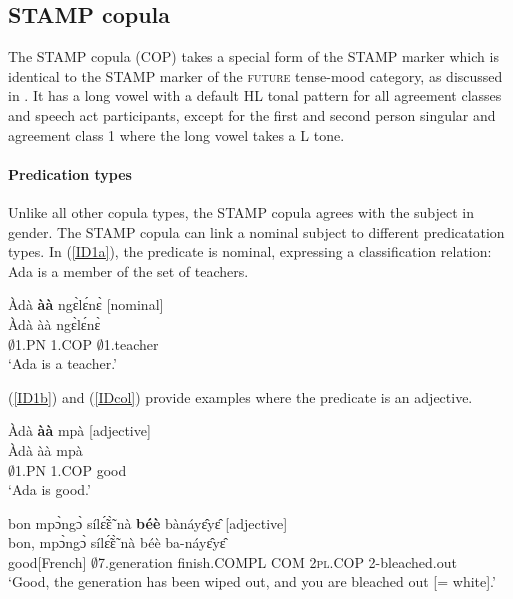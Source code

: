 \subsection{STAMP copula}
\label{sec:COP}

The STAMP copula (COP) takes a  special form of the STAMP marker which is identical to the STAMP marker of the \textsc{future} tense-mood category, as discussed in . It has a long vowel with a default HL tonal pattern for all agreement classes and speech act participants, except for the first and second person singular and agreement class 1 where the long vowel takes a L tone. 

\paragraph{Predication types} Unlike all other copula types, the STAMP copula agrees with the subject in gender. The STAMP copula can link a nominal subject to different predicatation types. In (\ref{ID1a}), the predicate is nominal, expressing a classification relation: Ada is a member of the set of teachers.  


\begin{exe}
\ex\label{ID1a}
  \glll Àdà {\bfseries àà} ngɛ̀lɛ́nɛ̀ \hfill [nominal] \\
        Àdà àà ngɛ̀lɛ́nɛ̀   \\
          $\emptyset$1.PN 1.COP $\emptyset$1.teacher  \\
    \trans `Ada is a teacher.'
\end{exe}

\noindent (\ref{ID1b}) and (\ref{IDcol}) provide examples where the predicate is an adjective.

\begin{exe}
\ex\label{ID1b}
  \glll Àdà {\bfseries àà} mpà \hfill [adjective] \\
        Àdà àà mpà  \\
          $\emptyset$1.PN 1.COP good  \\
    \trans `Ada is good.'
\end{exe}

\begin{exe} 
\ex\label{IDcol}
  \glll bon mpɔ̀ngɔ̀ sílɛ̃́ɛ̃̀ nà {\bfseries béè} bànáyɛ̂yɛ̂ \hfill [adjective] \\
        bon, mpɔ̀ngɔ̀ sílɛ̃́ɛ̃̀ nà béè ba-náyɛ̂yɛ̂  \\
      good[French] $\emptyset$7.generation finish.COMPL COM 2\textsc{pl}.COP 2-bleached.out  \\
    \trans `Good, the generation has been wiped out, and you are bleached out [= white].'
\end{exe}



